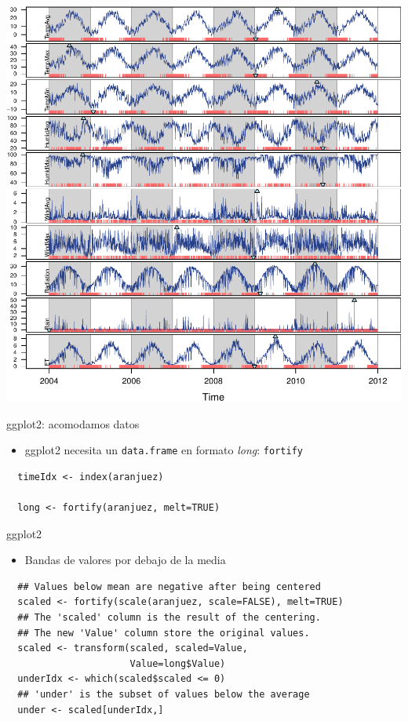 \documentclass[xcolor={usenames,svgnames,dvipsnames}]{beamer}
\begin{document}
\begin{frame}[label=sec-2-3-6]{}
\includegraphics[width=.9\linewidth]{figs/aranjuezXblocks.pdf}
\end{frame}

\begin{frame}[fragile,label=sec-2-3-7]{ggplot2: acomodamos datos}
 \begin{itemize}
\item ggplot2 necesita un \texttt{data.frame} en formato \emph{long}: \texttt{fortify}
\end{itemize}
\lstset{language=R,label= ,caption= ,numbers=none}
\begin{lstlisting}
  timeIdx <- index(aranjuez)
  
  long <- fortify(aranjuez, melt=TRUE)
\end{lstlisting}
\end{frame}
\begin{frame}[fragile,label=sec-2-3-8]{ggplot2}
 \begin{itemize}
\item Bandas de valores por debajo de la media
\end{itemize}
\lstset{language=R,label= ,caption= ,numbers=none}
\begin{lstlisting}
  ## Values below mean are negative after being centered
  scaled <- fortify(scale(aranjuez, scale=FALSE), melt=TRUE)
  ## The 'scaled' column is the result of the centering.
  ## The new 'Value' column store the original values.
  scaled <- transform(scaled, scaled=Value,
                      Value=long$Value)
  underIdx <- which(scaled$scaled <= 0)
  ## 'under' is the subset of values below the average
  under <- scaled[underIdx,]
\end{lstlisting}
\end{frame}
\end{document}
